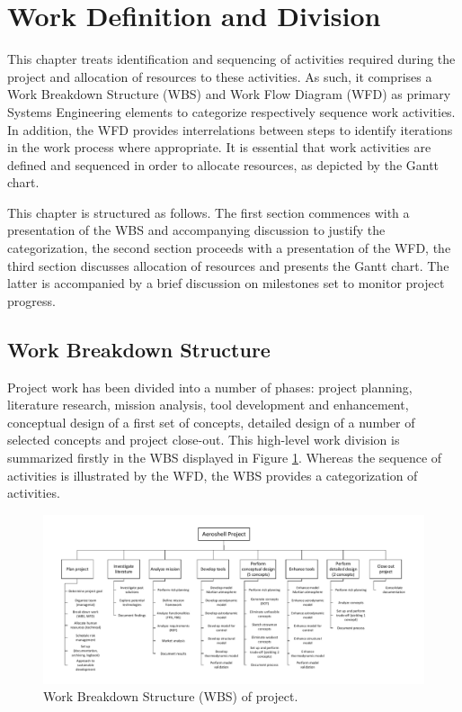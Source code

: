 \section{Work Definition and Division}
This chapter treats identification and sequencing of activities required during the project and allocation of resources to these activities. As such, it comprises a Work Breakdown Structure (WBS) and Work Flow Diagram (WFD) as primary Systems Engineering elements to categorize respectively sequence work activities. In addition, the WFD provides interrelations between steps to identify iterations in the work process where appropriate. It is essential that work activities are defined and sequenced in order to allocate resources, as depicted by the Gantt chart.

This chapter is structured as follows. The first section commences with a presentation of the WBS and accompanying discussion to justify the categorization, the second section proceeds with a presentation of the WFD, the third section discusses allocation of resources and presents the Gantt chart. The latter is accompanied by a brief discussion on milestones set to monitor project progress.

\subsection{Work Breakdown Structure}\label{cha:WBS}
Project work has been divided into a number of phases: project planning, literature research, mission analysis, tool development and enhancement, conceptual design of a first set of concepts, detailed design of a number of selected concepts and project close-out. This high-level work division is summarized firstly in the WBS displayed in Figure \ref{fig:wbs}. Whereas the sequence of activities is illustrated by the WFD, the WBS provides a categorization of activities. 

\begin{figure}
    \includegraphics{Figure/WBS.pdf}
    \caption{Work Breakdown Structure (WBS) of project.}
    \label{fig:wbs}
\end{figure}

